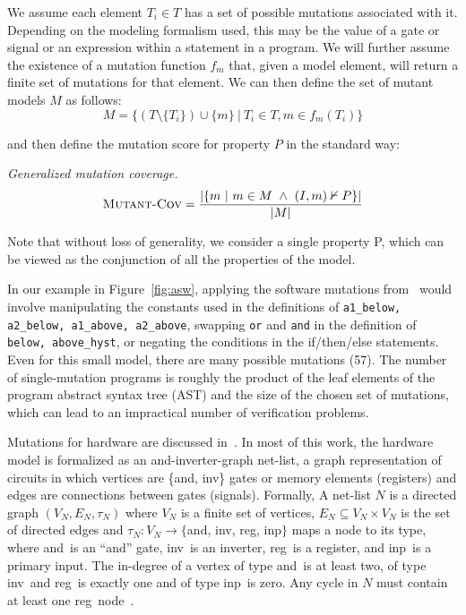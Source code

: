 We assume each element $T_i \in T$ has a set of possible mutations associated with it.  Depending on the modeling formalism used, this may be the value of a gate or signal or an expression within a statement in a program.  We will further assume the existence of a mutation function $f_{m}$ that, given a model element, will return a finite set of mutations for that element.  We can then define the set of mutant models $M$ as follows:
\[
    M = \{ (T \setminus \{T_i\}) \cup \{m\} \ |\ T_i \in T, m \in f_{m}(T_i) \}
\]

\noindent and then define the mutation score for property $P$ in the standard way:

\begin{definition} {\emph{Generalized mutation coverage.} } \\
\[
   \text{\sc Mutant-Cov} = \frac{ | \{m~|~ m \in M~\land~(I, m) \nvdash P\} |}{|M|}
\]
\end{definition}

\noindent Note that without loss of generality, we consider a single property P, which can be viewed as the conjunction of all the properties of the model.

In our example in Figure~\ref{fig:asw}, applying the software mutations from~\cite{Andrews06:mutation} would involve manipulating the constants used in the definitions of \texttt{a1\_below, a2\_below, a1\_above, a2\_above}, swapping \texttt{or} and \texttt{and} in the definition of \texttt{below, above\_hyst}, or negating the conditions in the if/then/else statements.  Even for this small model, there are many possible mutations (57).  The number of single-mutation programs is roughly the product of the leaf elements of the program abstract syntax tree (AST) and the size of the chosen set of mutations, which can lead to an impractical number of verification problems.

\newcommand{\andnode}{{\sc and}}
\newcommand{\invnode}{{\sc inv}}
\newcommand{\inpnode}{{\sc inp}}
\newcommand{\regnode}{{\sc reg}}
\newcommand{\mutnode}{{\sc mut}}
\newcommand{\inputnode}{{\sc input}}

Mutations for hardware are discussed in~\cite{chockler2010coverage,Kupferman:2006:SCF,kupferman_theory_2008}.  In most of this work, the hardware model is formalized as an and-inverter-graph net-list, a graph representation of circuits in which vertices are \{\andnode, \invnode\} gates or memory elements (registers) and edges are connections between gates (signals).  Formally, A net-list $N$ is a directed graph $(V_N,E_N, \tau_N)$ where $V_N$ is a finite set of vertices, $E_N \subseteq V_N \times V_N$ is the set of directed edges and $\tau_N : V_N \rightarrow \{$\andnode, \invnode, \regnode, \inpnode$\}$ maps a node to its type, where \andnode\ is an ``and'' gate, \invnode\ is an inverter, \regnode\ is a register, and \inpnode\ is a primary input.  The in-degree of a vertex of type \andnode\ is at least two, of type \invnode\ and \regnode\ is exactly one and of type \inpnode\ is zero. Any cycle in $N$ must contain at least one \regnode\ node~\cite{chockler2010coverage}.

